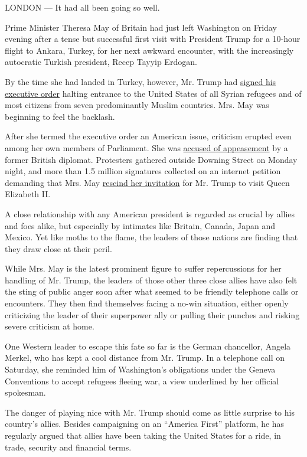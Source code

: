LONDON --- It had all been going so well.

Prime Minister Theresa May of Britain had just left Washington on Friday
evening after a tense but successful first visit with President Trump
for a 10-hour flight to Ankara, Turkey, for her next awkward encounter,
with the increasingly autocratic Turkish president, Recep Tayyip
Erdogan.

By the time she had landed in Turkey, however, Mr. Trump had
\href{https://www.nytimes.com/2017/01/29/us/politics/white-house-official-in-reversal-says-green-card-holders-wont-be-barred.html}{signed
his executive order} halting entrance to the United States of all Syrian
refugees and of most citizens from seven predominantly Muslim countries.
Mrs. May was beginning to feel the backlash.

After she termed the executive order an American issue, criticism
erupted even among her own members of Parliament. She was
\href{https://twitter.com/TFletcher/status/825405947333976065}{accused
of appeasement} by a former British diplomat. Protesters gathered
outside Downing Street on Monday night, and more than 1.5 million
signatures collected on an internet petition demanding that Mrs. May
\href{https://petition.parliament.uk/petitions/171928}{rescind her
invitation} for Mr. Trump to visit Queen Elizabeth II.

A close relationship with any American president is regarded as crucial
by allies and foes alike, but especially by intimates like Britain,
Canada, Japan and Mexico. Yet like moths to the flame, the leaders of
those nations are finding that they draw close at their peril.

While Mrs. May is the latest prominent figure to suffer repercussions
for her handling of Mr. Trump, the leaders of those other three close
allies have also felt the sting of public anger soon after what seemed
to be friendly telephone calls or encounters. They then find themselves
facing a no-win situation, either openly criticizing the leader of their
superpower ally or pulling their punches and risking severe criticism at
home.

One Western leader to escape this fate so far is the German chancellor,
Angela Merkel, who has kept a cool distance from Mr. Trump. In a
telephone call on Saturday, she reminded him of Washington's obligations
under the Geneva Conventions to accept refugees fleeing war, a view
underlined by her official spokesman.

The danger of playing nice with Mr. Trump should come as little surprise
to his country's allies. Besides campaigning on an ``America First''
platform, he has regularly argued that allies have been taking the
United States for a ride, in trade, security and financial terms.

